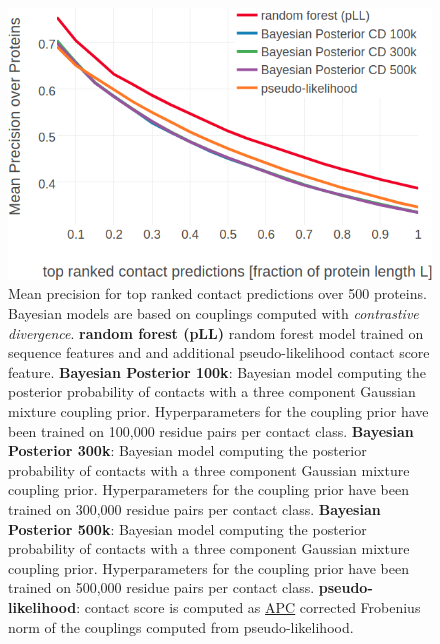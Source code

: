 \documentclass[11pt,a4paper,twoside]{book}
\theoremstyle{definition}
\theoremstyle{definition}
\theoremstyle{remark}
\begin{document}
\begin{figure}

{\centering \includegraphics[width=0.9\linewidth]{img/bayesian_model/benchmark/precision_vs_rank_cd_3comp_all_datasets} 

}

\caption{Mean precision for top
ranked contact predictions over 500 proteins. Bayesian models are based
on couplings computed with \emph{contrastive divergence}. \textbf{random
forest (pLL)} random forest model trained on sequence features and and
additional pseudo-likelihood contact score feature. \textbf{Bayesian
Posterior 100k}: Bayesian model computing the posterior probability of
contacts with a three component Gaussian mixture coupling prior.
Hyperparameters for the coupling prior have been trained on 100,000
residue pairs per contact class. \textbf{Bayesian Posterior 300k}:
Bayesian model computing the posterior probability of contacts with a
three component Gaussian mixture coupling prior. Hyperparameters for the
coupling prior have been trained on 300,000 residue pairs per contact
class. \textbf{Bayesian Posterior 500k}: Bayesian model computing the
posterior probability of contacts with a three component Gaussian
mixture coupling prior. Hyperparameters for the coupling prior have been
trained on 500,000 residue pairs per contact class.
\textbf{pseudo-likelihood}: contact score is computed as
\protect\hyperlink{abbrev}{APC} corrected Frobenius norm of the
couplings computed from pseudo-likelihood.}\label{fig:precision-bayesian-model-cd-3comp}
\end{figure}
\end{document}
